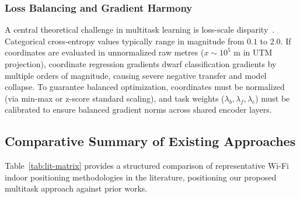 \subsubsection{Loss Balancing and Gradient Harmony}
A central theoretical challenge in multitask learning is loss-scale disparity~\cite{chen2018gradnorm, ruder2017overview}. Categorical cross-entropy values typically range in magnitude from $0.1$ to $2.0$. If coordinates are evaluated in unnormalized raw metres ($x \sim 10^5\text{ m}$ in UTM projection), coordinate regression gradients dwarf classification gradients by multiple orders of magnitude, causing severe negative transfer and model collapse. To guarantee balanced optimization, coordinates must be normalized (via min-max or z-score standard scaling), and task weights ($\lambda_b, \lambda_f, \lambda_c$) must be calibrated to ensure balanced gradient norms across shared encoder layers.

\subsection{Comparative Summary of Existing Approaches}
Table~\ref{tab:lit-matrix} provides a structured comparison of representative Wi-Fi indoor positioning methodologies in the literature, positioning our proposed multitask approach against prior works.

